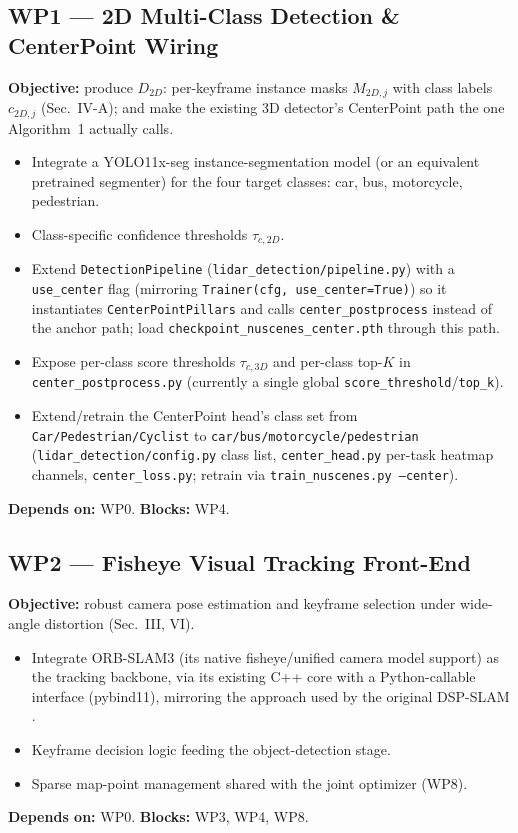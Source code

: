 \documentclass[11pt]{article}
\begin{document}
\subsection*{WP1 --- 2D Multi-Class Detection \& CenterPoint Wiring}
\textbf{Objective:} produce $D_{2D}$: per-keyframe instance masks $M_{2D,j}$ with class labels $c_{2D,j}$ (Sec.~IV-A); and make the existing 3D detector's CenterPoint path the one Algorithm~1 actually calls.
\begin{itemize}[nosep]
  \item Integrate a YOLO11x-seg \cite{jocher2024yolo11} instance-segmentation model (or an equivalent pretrained segmenter) for the four target classes: car, bus, motorcycle, pedestrian.
  \item Class-specific confidence thresholds $\tau_{c,2D}$.
  \item Extend \texttt{DetectionPipeline} (\texttt{lidar\_detection/pipeline.py}) with a \texttt{use\_center} flag (mirroring \texttt{Trainer(cfg, use\_center=True)}) so it instantiates \texttt{CenterPointPillars} and calls \texttt{center\_postprocess} instead of the anchor path; load \texttt{checkpoint\_nuscenes\_center.pth} through this path.
  \item Expose per-class score thresholds $\tau_{c,3D}$ and per-class top-$K$ in \texttt{center\_postprocess.py} (currently a single global \texttt{score\_threshold}/\texttt{top\_k}).
  \item Extend/retrain the CenterPoint head's class set from \texttt{Car/Pedestrian/Cyclist} to \texttt{car/bus/motorcycle/pedestrian} (\texttt{lidar\_detection/config.py} class list, \texttt{center\_head.py} per-task heatmap channels, \texttt{center\_loss.py}; retrain via \texttt{train\_nuscenes.py --center}).
\end{itemize}
\textbf{Depends on:} WP0. \textbf{Blocks:} WP4.

\subsection*{WP2 --- Fisheye Visual Tracking Front-End}
\textbf{Objective:} robust camera pose estimation and keyframe selection under wide-angle distortion (Sec.~III, VI).
\begin{itemize}[nosep]
  \item Integrate ORB-SLAM3 \cite{campos2021orbslam3} (its native fisheye/unified camera model support) as the tracking backbone, via its existing C++ core with a Python-callable interface (pybind11), mirroring the approach used by the original DSP-SLAM \cite{wang2021dspslam}.
  \item Keyframe decision logic feeding the object-detection stage.
  \item Sparse map-point management shared with the joint optimizer (WP8).
\end{itemize}
\textbf{Depends on:} WP0. \textbf{Blocks:} WP3, WP4, WP8.
\end{document}
